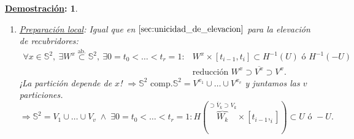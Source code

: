 \documentclass[10pt,a4paper,openright]{book}
\theoremstyle{break}
\newtheorem*{demo}{\underline{Demostración}:}
\begin{document}
\begin{demo}
\begin{enumerate}
    En $U: x_3 \neq 1,\ \{\eta\left( x \right) = \left( 1 - x_3 - x_1^2, -x_1x_2, x_1\left( 1- x_3 \right) \right),\ \eta\left( x \right) = x \times \eta\left( x \right)\}$ base de $T_x\mathbb{S}^{2}$ ortogonal. $\Rightarrow \forall \underbrace{u}_{\neq 0} \perp x: u = \lambda\left( u, x \right) \eta\left( x \right) + \mu\left( u, x \right) \eta\left( x \right)$.
    \[
    \begin{cases}
        \lambda\left( u, x \right) = \langle u, \eta\left( x \right) \rangle / \lVert \eta\left( x \right) \rVert^2\\
        \mu\left( u, x \right) = \langle u, \eta\left( x \right) \rangle / \lVert \eta\left( x \right) \rVert^2
    \end{cases} \text{ cond's ?? continuas.} 
    \]

    En $-U : x_3\neq -1$ igual con $\eta\left( x \right) = \left( 1 + x_3 - x_1^2, -x_1x_2, -x_1\left( 1 + x_3 \right) \right)$.

    \item \underline{Preparación local}: Igual que en $\ref{sec:unicidad_de_elevacion}$ para la elevación de recubridores:
    \begin{align*}
        \forall x \in \mathbb{S}^{2},\ \exists W^x \stackrel{\text{ab.}}{\subset} \mathbb{S}^{2},\ \exists 0 = t_0 < \ldots < t_r = 1 : &W^x \times \left[ t_{i - 1}, t_i \right] \subset H^{-1}\left( U \right) \text{ ó } H^{-1}\left( -U \right)\\
        &\text{reducción } W^x \supset \overline{V^x} \supset V^x
    .\end{align*}
    ¡La partición depende de $x$! $\Rightarrow{\mathbb{S}^{2}\text{ comp.}} \mathbb{S}^{2} = V^{x_1} \cup \ldots \cup V^{x_v}$ y juntamos las $v$ particiones.
    \[
    \Rightarrow \mathbb{S}^{2} = V_1 \cup \ldots \cup V_v\; \land \;\exists 0 = t_0 < \ldots < t_r = 1: H\left( \overbrace{W_k}^{\supset \overline{V}_k \supset V_k} \times \left[ t_{i - 1}, _i \right] \right) \subset U \text{ ó } -U.
    \]


\end{enumerate}
\end{demo}
\end{document}
